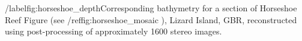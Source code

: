 /label{fig:horseshoe_depth}Corresponding bathymetry for a section of Horseshoe Reef Figure (see /ref{fig:horseshoe_mosaic} ), Lizard Island, GBR, reconstructed using post-processing of approximately 1600 stereo images.